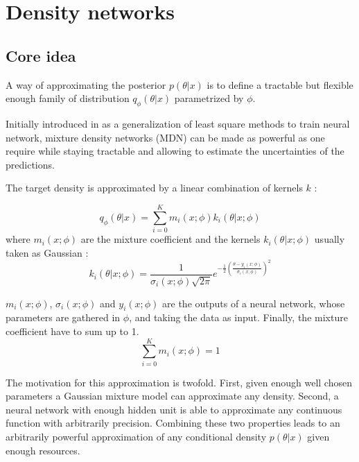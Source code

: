 
\section{Density networks} %
\label{sec:density_networks}



\subsection{Core idea} %
\label{sub:core_idea}


A way of approximating the posterior $p(\theta | x)$ is to define a tractable but flexible enough family of distribution $q_\phi(\theta | x)$ parametrized by $\phi$.

Initially introduced in \cite{Bishop94mixturedensity} as a generalization of least square methods to train neural network, mixture density networks (MDN) can be made as powerful as one require while staying tractable and allowing to estimate the uncertainties of the predictions.

The target density is approximated by a linear combination of kernels $k$ :

\begin{equation}
    q_\phi(\theta | x) = \sum_{i=0}^K m_i(x ; \phi) k_i(\theta | x ; \phi)
\end{equation}
where $m_i(x ; \phi)$ are the mixture coefficient
and the kernels $k_i(\theta | x ; \phi)$ usually taken as Gaussian :
\begin{equation}
    k_i(\theta | x ; \phi) = \frac{1}{\sigma_i(x ; \phi) \sqrt{2 \pi}} e^{- \frac{1}{2} \left ( \frac{\theta-y_i(x ; \phi)}{\sigma_i(x ; \phi)} \right )^2} 
\end{equation}

$m_i(x ; \phi)$, $\sigma_i(x ; \phi)$ and $y_i(x ; \phi)$ are the outputs of a neural network, whose parameters are gathered in $\phi$, and taking the data as input.
Finally, the mixture coefficient have to sum up to 1.
\begin{equation}
    \sum_{i=0}^K m_i(x ; \phi) =  1
\end{equation}

The motivation for this approximation is twofold.
First, given enough well chosen parameters a Gaussian mixture model can approximate any density.
Second, a neural network with enough hidden unit is able to approximate any continuous function with arbitrarily precision.
Combining these two properties leads to an arbitrarily powerful approximation of any conditional density $p(\theta|x)$ given enough resources.

